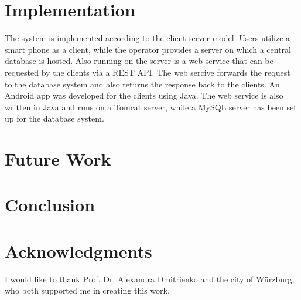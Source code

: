 \documentclass[
a4paper,     %
titlepage,   %
14pt         %
]{scrartcl}  %
\theoremstyle{mystyle}
\begin{document}
\section{Implementation}
The system is implemented according to the client-server model. Users utilize a smart phone as a client, while the operator provides a server on which a central database is hosted. Also running on the server is a web service that can be requested by the clients via a REST API. The web sercive forwards the request to the database system and also returns the response back to the clients. An Android app was developed for the clients using Java. The web service is also written in Java and runs on a Tomcat server, while a MySQL server has been set up for the database system.

\section{Future Work}

\section{Conclusion}

\section{Acknowledgments}
I would like to thank Prof. Dr. Alexandra Dmitrienko and the city of Würzburg, who both supported me in creating this work.




















\end{document}
